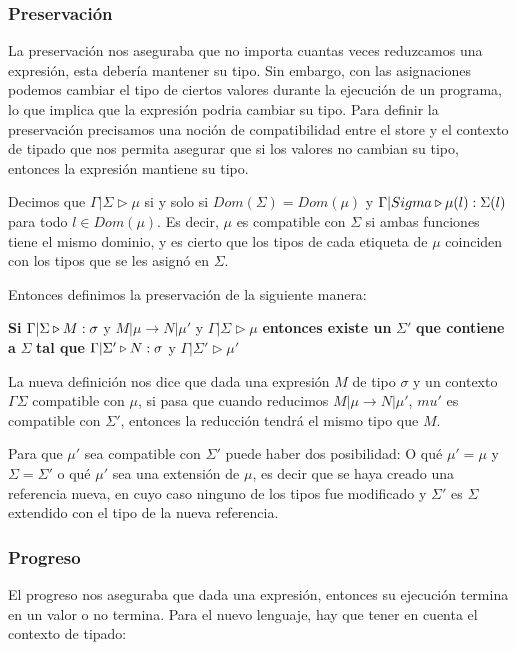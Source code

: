 \subsubsection{Preservación} La preservación nos aseguraba que no importa cuantas veces reduzcamos una expresión, esta debería mantener su tipo. Sin embargo, con las asignaciones podemos cambiar el tipo de ciertos valores durante la ejecución de un programa, lo que implica que la expresión podria cambiar su tipo. Para definir la preservación precisamos una noción de compatibilidad entre el store y el contexto de tipado que nos permita asegurar que si los valores no cambian su tipo, entonces la expresión mantiene su tipo.

Decimos que $\Gamma|\Sigma\triangleright\mu$ si y solo si $Dom(\Sigma) = Dom(\mu)$ y $\Gamma|Sigma\triangleright \mu(l) : \Sigma(l)$ para todo $l\in Dom(\mu)$. Es decir, $\mu$ es compatible con $\Sigma$ si ambas funciones tiene el mismo dominio, y es cierto que los tipos de cada etiqueta de $\mu$ coinciden con los tipos que se les asignó en $\Sigma$.

Entonces definimos la preservación de la siguiente manera:
\begin{centrado}
	\textbf{Si}  $\Gamma|\Sigma\triangleright M : \sigma$ y $M|\mu\to N|\mu'$ y $\Gamma|\Sigma\triangleright\mu$ \textbf{entonces existe un} $\Sigma'$ \textbf{que contiene a} $\Sigma$\textbf{ tal que} $\Gamma|\Sigma'\triangleright N : \sigma$ y $\Gamma|\Sigma'\triangleright\mu'$
\end{centrado}

La nueva definición nos dice que dada una expresión $M$ de tipo $\sigma$ y un contexto $\Gamma\Sigma$ compatible con $\mu$, si pasa que cuando reducimos $M|\mu\to N|\mu'$, $mu'$ es compatible con $\Sigma'$, entonces la reducción tendrá el mismo tipo que $M$.

Para que $\mu'$ sea compatible con $\Sigma'$ puede haber dos posibilidad: O qué $\mu' = \mu$ y $\Sigma = \Sigma'$ o qué $\mu'$ sea una extensión de $\mu$, es decir que se haya creado una referencia nueva, en cuyo caso ninguno de los tipos fue modificado y $\Sigma'$ es $\Sigma$ extendido con el tipo de la nueva referencia.

\subsubsection{Progreso} El progreso nos aseguraba que dada una expresión, entonces su ejecución termina en un valor o no termina. Para el nuevo lenguaje, hay que tener en cuenta el contexto de tipado:

